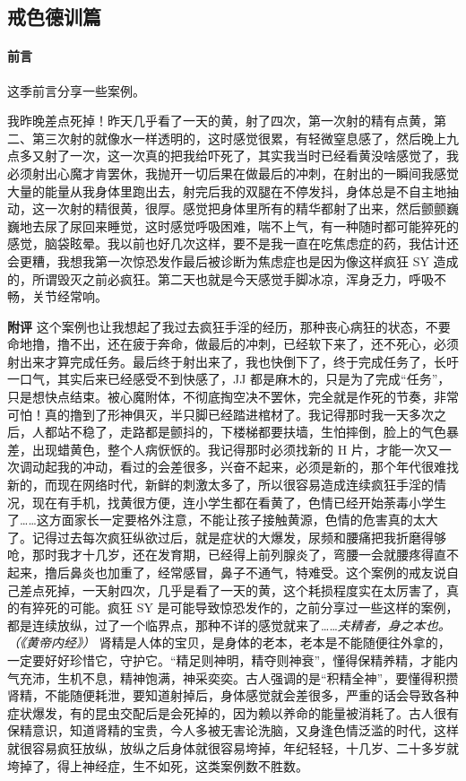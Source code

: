 \subsection{戒色德训篇}

\paragraph*{前言}

这季前言分享一些案例。

\begin{case}
    我昨晚差点死掉！昨天几乎看了一天的黄，射了四次，第一次射的精有点黄，第二、第三次射的就像水一样透明的，这时感觉很累，有轻微窒息感了，然后晚上九点多又射了一次，这一次真的把我给吓死了，其实我当时已经看黄没啥感觉了，我必须射出心魔才肯罢休，我抛开一切后果在做最后的冲刺，在射出的一瞬间我感觉大量的能量从我身体里跑出去，射完后我的双腿在不停发抖，身体总是不自主地抽动，这一次射的精很黄，很厚。感觉把身体里所有的精华都射了出来，然后颤颤巍巍地去尿了尿回来睡觉，这时感觉呼吸困难，喘不上气，有一种随时都可能猝死的感觉，脑袋眩晕。我以前也好几次这样，要不是我一直在吃焦虑症的药，我估计还会更糟，我想我第一次惊恐发作最后被诊断为焦虑症也是因为像这样疯狂 SY 造成的，所谓毁灭之前必疯狂。第二天也就是今天感觉手脚冰凉，浑身乏力，呼吸不畅，关节经常响。

    \textbf{附评} 这个案例也让我想起了我过去疯狂手淫的经历，那种丧心病狂的状态，不要命地撸，撸不出，还在疲于奔命，做最后的冲刺，已经软下来了，还不死心，必须射出来才算完成任务。最后终于射出来了，我也快倒下了，终于完成任务了，长吁一口气，其实后来已经感受不到快感了，JJ 都是麻木的，只是为了完成“任务”，只是想快点结束。被心魔附体，不彻底掏空决不罢休，完全就是作死的节奏，非常可怕！真的撸到了形神俱灭，半只脚已经踏进棺材了。我记得那时我一天多次之后，人都站不稳了，走路都是颤抖的，下楼梯都要扶墙，生怕摔倒，脸上的气色暴差，出现蜡黄色，整个人病恹恹的。我记得那时必须找新的 H 片，才能一次又一次调动起我的冲动，看过的会差很多，兴奋不起来，必须是新的，那个年代很难找新的，而现在网络时代，新鲜的刺激太多了，所以很容易造成连续疯狂手淫的情况，现在有手机，找黄很方便，连小学生都在看黄了，色情已经开始荼毒小学生了……这方面家长一定要格外注意，不能让孩子接触黄源，色情的危害真的太大了。记得过去每次疯狂纵欲过后，就是症状的大爆发，尿频和腰痛把我折磨得够呛，那时我才十几岁，还在发育期，已经得上前列腺炎了，弯腰一会就腰疼得直不起来，撸后鼻炎也加重了，经常感冒，鼻子不通气，特难受。这个案例的戒友说自己差点死掉，一天射四次，几乎是看了一天的黄，这个耗损程度实在太厉害了，真的有猝死的可能。疯狂 SY 是可能导致惊恐发作的，之前分享过一些这样的案例，都是连续放纵，过了一个临界点，那种不详的感觉就来了……\textit{夫精者，身之本也。（《黄帝内经》）} 肾精是人体的宝贝，是身体的老本，老本是不能随便往外拿的，一定要好好珍惜它，守护它。“精足则神明，精夺则神衰”，懂得保精养精，才能内气充沛，生机不息，精神饱满，神采奕奕。古人强调的是“积精全神”，要懂得积攒肾精，不能随便耗泄，要知道射掉后，身体感觉就会差很多，严重的话会导致各种症状爆发，有的昆虫交配后是会死掉的，因为赖以养命的能量被消耗了。古人很有保精意识，知道肾精的宝贵，今人多被无害论洗脑，又身逢色情泛滥的时代，这样就很容易疯狂放纵，放纵之后身体就很容易垮掉，年纪轻轻，十几岁、二十多岁就垮掉了，得上神经症，生不如死，这类案例数不胜数。


\end{case}
